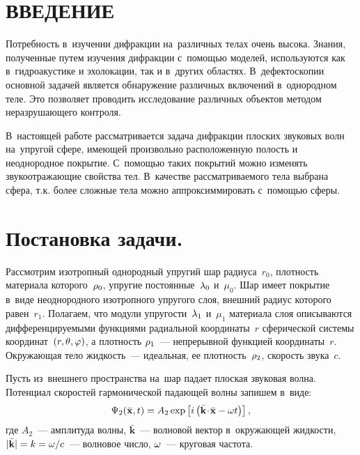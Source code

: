 

\renewcommand{\bibname}{СПИСОК ИСПОЛЬЗОВАННЫХ ИСТОЧНИКОВ}
\renewcommand\refname{СПИСОК ИСПОЛЬЗОВАННЫХ ИСТОЧНИКОВ}

%

\setcounter{page}{5}
\thispagestyle {empty}
\renewcommand{\contentsname}{\centering СОДЕРЖАНИЕ}
\tableofcontents

\newpage
\section*{ВВЕДЕНИЕ}
Потребность в~изучении дифракции на~различных телах очень высока. Знания, полученные путем изучения дифракции с~помощью моделей, используются как в~гидроакустике и эхолокации, так и в~других областях. В~дефектоскопии основной задачей является обнаружение различных включений в~однородном теле. Это позволяет проводить исследование различных объектов методом неразрушающего контроля.

В~настоящей работе рассматривается задача дифракции плоских звуковых волн на~упругой сфере, имеющей произвольно расположенную полость и неоднородное покрытие. С~помощью таких покрытий можно изменять звукоотражающие свойства тел. В~качестве рассматриваемого тела выбрана сфера, т.к. более сложные тела можно аппроксиммировать с~помощью сферы. 


\newpage

\section{Постановка задачи.} Рассмотрим изотропный однородный упругий шар радиуса~$r_0$, плотность материала которого~$\rho_0$, упругие постоянные~$\lambda_0$ и~$\mu_0$. Шар имеет покрытие в~виде неоднородного изотропного упругого слоя, внешний радиус которого равен~$r_1$. Полагаем, что модули упругости~$\lambda_1$ и~$\mu_1$ материала слоя описываются дифференцируемыми функциями радиальной координаты~$r$ сферической системы координат~$(r, \theta, \varphi)$, а плотность $\rho_1$~--- непрерывной функцией координаты~$r$. Окружающая тело жидкость~--- идеальная, ее плотность~$\rho_2$, скорость звука~$c$. 

Пусть из~внешнего пространства на~шар падает плоская звуковая волна. Потенциал скоростей гармонической падающей волны запишем в~виде:
\begin{equation}\label{potential speed}
\Psi_2(\bar{\mathbf{x}}, t) = A_2 \exp\left[i\left(\bar{\mathbf{k}}\!\cdot\!\bar{\mathbf{x}}-\omega t\right)\right],
\end{equation}
где $A_2$~--- амплитуда волны, $\bar{\mathbf{k}}$~--- волновой вектор в~окружающей жидкости,  $\lvert\bar{\mathbf{k}}\rvert = k = \omega / c$~--- волновое число, $\omega$~--- круговая частота.

